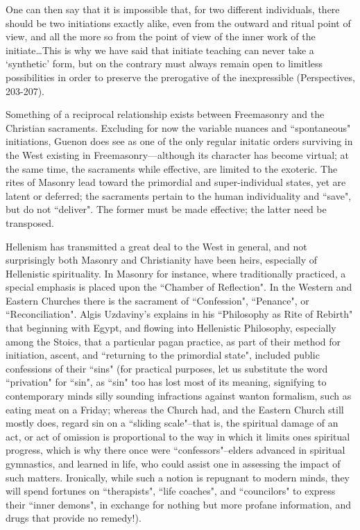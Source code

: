 \begin{quotex}
One can then say that it is impossible that, for two different individuals, there should be two initiations exactly alike, even from the outward and ritual point of view, and all the more so from the point of view of the inner work of the initiate…This is why we have said that initiate teaching can never take a `synthetic' form, but on the contrary must always remain open to limitless possibilities in order to preserve the prerogative of the inexpressible (Perspectives, 203-207). 

\end{quotex}
Something of a reciprocal relationship exists between Freemasonry and the Christian sacraments. Excluding for now the variable nuances and ``spontaneous" initiations, Guenon does see as one of the only regular initatic orders surviving in the West existing in Freemasonry—although its character has become virtual; at the same time, the sacraments while effective, are limited to the exoteric. The rites of Masonry lead toward the primordial and super-individual states, yet are latent or deferred; the sacraments pertain to the human individuality and ``save", but do not ``deliver". The former must be made effective; the latter need be transposed.

Hellenism has transmitted a great deal to the West in general, and not surprisingly both Masonry and Christianity have been heirs, especially of Hellenistic spirituality. In Masonry for instance, where traditionally practiced, a special emphasis is placed upon the ``Chamber of Reflection". In the Western and Eastern Churches there is the sacrament of ``Confession", ``Penance", or ``Reconciliation". Algis Uzdaviny's explains in his ``Philosophy as Rite of Rebirth" that beginning with Egypt, and flowing into Hellenistic Philosophy, especially among the Stoics, that a particular pagan practice, as part of their method for initiation, ascent, and ``returning to the primordial state", included public confessions of their ``sins" (for practical purposes, let us substitute the word ``privation" for ``sin", as ``sin" too has lost most of its meaning, signifying to contemporary minds silly sounding infractions against wanton formalism, such as eating meat on a Friday; whereas the Church had, and the Eastern Church still mostly does, regard sin on a ``sliding scale"–that is, the spiritual damage of an act, or act of omission is proportional to the way in which it limits ones spiritual progress, which is why there once were ``confessors"–elders advanced in spiritual gymnastics, and learned in life, who could assist one in assessing the impact of such matters. Ironically, while such a notion is repugnant to modern minds, they will spend fortunes on ``therapists", ``life coaches", and ``councilors" to express their ``inner demons", in exchange for nothing but more profane information, and drugs that provide no remedy!).

